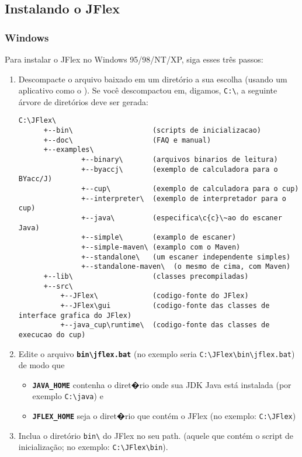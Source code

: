 \documentclass[11pt]{scrartcl}
\newcommand{\xsmall}{}
\begin{document}
\subsection{Instalando o JFlex}

\subsubsection{Windows\label{install:windows}}
Para instalar o JFlex no Windows 95/98/NT/XP, siga esses tr\^es passos:
\begin{enumerate}
\item
Descompacte o arquivo baixado em um diret\'orio a sua escolha (usando
um aplicativo como o 
).
Se voc\^e descompactou em, digamos, \verb+C:\+, a seguinte \'arvore de diret\'orios deve ser gerada:
{\xsmall
\begin{verbatim}
C:\JFlex\                          
      +--bin\                   (scripts de inicializacao) 
      +--doc\                   (FAQ e manual)
      +--examples\ 
               +--binary\       (arquivos binarios de leitura)
               +--byaccj\       (exemplo de calculadora para o BYacc/J)
               +--cup\          (exemplo de calculadora para o cup)
               +--interpreter\  (exemplo de interpretador para o cup)
               +--java\         (especifica\c{c}\~ao do escaner Java) 
               +--simple\       (examplo de escaner)
               +--simple-maven\ (examplo com o Maven)
               +--standalone\   (um escaner independente simples)
               +--standalone-maven\  (o mesmo de cima, com Maven)
      +--lib\                   (classes precompiladas) 
      +--src\ 
          +--JFlex\             (codigo-fonte do JFlex) 
          +--JFlex\gui          (codigo-fonte das classes de interface grafica do JFlex)
          +--java_cup\runtime\  (codigo-fonte das classes de execucao do cup) 
\end{verbatim}
}

\item
Edite o arquivo {\bf \verb+bin\jflex.bat+}
(no exemplo seria \verb+C:\JFlex\bin\jflex.bat+)
de modo que

\begin{itemize}
\item
  {\bf \texttt{JAVA\_HOME}} contenha o diret�rio onde sua JDK Java est\'a instalada
  (por exemplo \verb+C:\java+) e
\item
  {\bf \texttt{JFLEX\_HOME}} seja o diret�rio que cont\'em o JFlex (no exemplo:
  \verb+C:\JFlex+) 
\end{itemize}
 
\item
Inclua o diret\'orio \verb+bin\+ do JFlex no seu path.
(aquele que cont\'em o script de inicializa\c{c}\~ao; no exemplo: \verb+C:\JFlex\bin+).
\end{enumerate}
\end{document}
